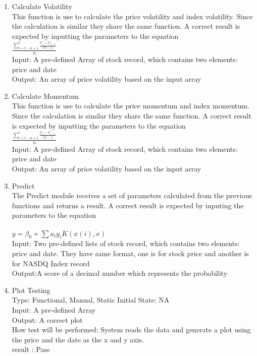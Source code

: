 \documentclass[12pt, titlepage]{article}
\begin{document}
\begin{enumerate}

\item{ Calculate Volatility\\}
This function is use to calculate the price volatility and index volatility. Since the calculation is similar they share the same function. A correct result is expected by inputting the parameters to the equation \\
$\frac{\sum_{i=t-n+1}^{t} \frac{C_i-C_{i-1}}{C{i-1}}}{n}$ \\ 

Input: A pre-defined Array of stock record, which contains two elements: price and date\\
Output: An array of price volatility based on the input array\\


\item{ Calculate Momentum\\}
This function is use to calculate the price momentum and index momentum. Since the calculation is similar they share the same function. A correct result is expected by inputting the parameters to the equation \\
$\frac{\sum_{i=t-n+1}^{t} \frac{C_i-C_{i-1}}{C{i-1}}}{n}$ \\ 

Input: A pre-defined Array of stock record, which contains two elements: price and date\\
Output: An array of price volatility based on the input array\\


\item{Predict \\}
The Predict module receives a set of parameters calculated from the previous functions and returns a result. A correct result is expected by inputing the parameters to the equation \\\\
$y=\beta _0+\sum {a_iy_iK(x(i),x)}$\\
Input: Two pre-defined lists of stock record, which contains two elements: price and date. They have same format, one is for stock price and another is for NASDQ Index record\\
Output:A score of a decimal number which represents the probability\\

\item{Plot Testing\\}
Type: Functional, Manual, Static
Initial State: NA\\
Input: A pre-defined Array\\
Output: A correct plot\\
How test will be performed: System reads the data and generate a plot using the price and the date as the x and y axis.\\
result : Pass\\
\end{enumerate} 
\end{document}
